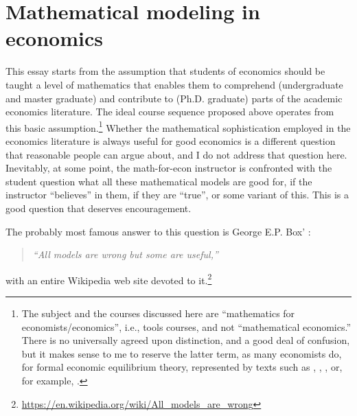 \documentclass[graybox]{svmult}
\begin{document}
\section{Mathematical modeling in economics}
\label{sec:2}
This essay starts from the assumption that students of economics should be taught a level of mathematics that enables them to comprehend (undergraduate and master graduate) and contribute to (Ph.D. graduate) parts of the academic economics literature. The ideal course sequence proposed above operates from this basic assumption.\footnote{The subject and the courses discussed here are ``mathematics for economists/economics'', i.e., tools courses, and not ``mathematical economics.'' There is no universally agreed upon distinction, and a good deal of confusion, but it makes sense to me to reserve the latter term, as many economists do, for formal economic equilibrium theory, represented by texts such as \cite{Debreu1959}, \cite{Arrow1963}, \cite{Arrow1981,Arrow1982,Arrow1986}, or, for example, \cite{Stigum1990}.} Whether the mathematical sophistication employed in the economics literature is always useful for good economics is a different question that reasonable people can argue about, and I do not address that question here. Inevitably, at some point, the math-for-econ instructor is confronted with the student question what all these mathematical models are good for, if the instructor ``believes'' in them, if they are ``true'', or some variant of this. This is a good question that deserves encouragement.

The probably most famous answer to this question is George E.P. Box' \citep{BOX1979201}:

\begin{quote}\it
``All models are wrong but some are useful,'' 
\end{quote}
with an entire  Wikipedia web site devoted to it.\footnote{\url{https://en.wikipedia.org/wiki/All_models_are_wrong}}
\end{document}
